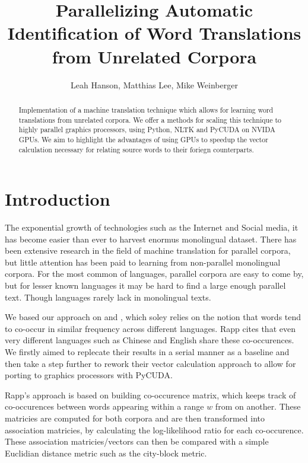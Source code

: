 \documentclass[12pt]{article}
\title{Parallelizing Automatic Identification of Word Translations from Unrelated Corpora}
\author{Leah Hanson, Matthias Lee, Mike Weinberger}
\begin{document}
\maketitle
\begin{abstract}

Implementation of a machine translation technique which allows for learning word translations from unrelated corpora. We offer a methods for scaling this technique to highly parallel graphics processors, using Python, NLTK and PyCUDA on NVIDA GPUs. We aim to highlight the advantages of using GPUs to speedup the vector calculation necessary for relating source words to their foriegn counterparts.

\end{abstract}
\section{Introduction}

The exponential growth of technologies such as the Internet and Social media, it has become easier than ever to harvest enormus monolingual dataset. There has been extensive research in the field of machine translation for parallel corpora, but little attention has been paid to learning from non-parallel monolingual corpora. For the most common of languages, parallel corpora are easy to come by, but for lesser known languages it may be hard to find a large enough parallel text. Though languages rarely lack in monolingual texts. 

We based our approach on \cite{rapp1999automatic} and \cite{rapp1995identifying}, which soley relies on the notion that words tend to co-occur in similar frequency across different languages. Rapp cites that even very different languages such as Chinese and English share these co-occurences. We firstly aimed to replecate their results in a serial manner as a baseline and then take a step further to rework their vector calculation approach to allow for porting to graphics processors with PyCUDA. 

Rapp's approach is based on building co-occurence matrix, which keeps track of co-occurences between words appearing within a range $w$ from on another. These matricies are computed for both corpora and are then transformed into association matricies, by calculating the log-likelihood ratio for each co-occurence. These association matricies/vectors can then be compared with a simple Euclidian distance metric such as the city-block metric.
\end{document}
